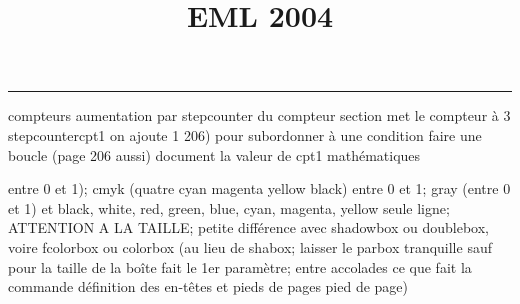 \documentclass[11pt]{article}%
\title{\bf \vspace{-2cm} EML 2004} %
\author{} %
\date{} %
\renewcommand{\headrulewidth}{0pt}%
\renewcommand{\footrulewidth}{0.4pt}%
\begin{document}
\maketitle %
\vspace{-1.4cm}\hrule %
\thispagestyle{fancy}

\vspace*{.2cm}



compteurs%
aumentation par stepcounter du compteur section%
met le compteur à 3%
stepcounter{cpt1} on ajoute 1%
206) pour subordonner à une condition %
faire une boucle (page 206 aussi) %
document la valeur de cpt1 
mathématiques\newcommand{\ch}{\operatorname{ch}} 
\newcommand{\sh}{\operatorname{sh}}
\renewcommand{\tanh}{\operatorname{th}}
\renewcommand{\sinh}{\operatorname{sh}}
\renewcommand{\cosh}{\operatorname{ch}}
\newcommand{\argsh}{\operatorname{argsh}}
\newcommand{\argch}{\operatorname{argch}}
\newcommand{\argth}{\operatorname{argth}}
\newcommand{\ker}{\operatorname{Ker}}
\renewcommand{\im}{\operatorname{Im}}
\newcommand{\rg}{\operatorname{rg}}
\newcommand{\Id}{\operatorname{Id}}
\newcommand{\id}{\operatorname{id}}
\renewcommand{\leq}{\leq}
\renewcommand{\geq}{\geq }

entre 0 et 1); cmyk (quatre cyan magenta yellow black) entre 0 et 1;
gray (entre 0 et 1) et black, white, red, green, blue, cyan, magenta,
yellow%
seule ligne; ATTENTION A LA TAILLE; petite différence avec shadowbox ou
doublebox, voire fcolorbox ou colorbox (au lieu de shabox; laisser le
parbox tranquille sauf pour la taille de la boîte
\newcommand{\Tbox}[1]{\begin{center} \shabox{\parbox{0.6
\linewidth}{#1}} \end{center}} %
fait le 1er paramètre; entre accolades ce que fait la commande
définition des en-têtes et pieds de pages\pagestyle{fancy}
\chead{}
\rfoot[ \ \thepage]{\thepage}
\cfoot{}
\lfoot{}
\thispagestyle{fancy} %
pied de page)\renewcommand{\footrulewidth}{0.4pt}
\renewcommand{\headrulewidth}{0.4pt}
\end{document}
